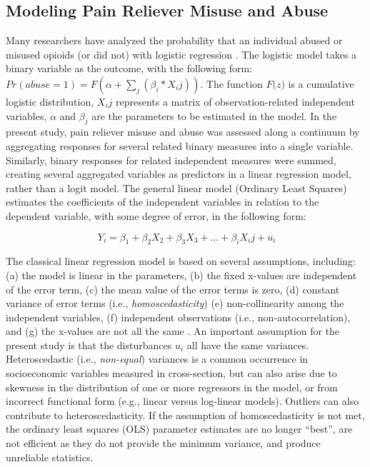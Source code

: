 \documentclass[sigconf]{acmart}
\begin{document}

\subsection{Modeling Pain Reliever Misuse and Abuse}

Many researchers have analyzed the probability that an individual abused 
or misused opioids (or did not) with logistic regression 
\cite{rice12, unick13, jones15, mccabe12, zedler14}. The logistic model takes
a binary variable as the outcome, with the following form: $ Pr(abuse=1) = 
\textit{F}(\alpha+\sum_j(\beta_i*X_ij)) $. The function $\textit{F(z)}$
is a cumulative logistic distribution, $\textit{X}_ij$ represents a matrix 
of observation-related independent variables, $\alpha$ and $\beta_j$ are the
parameters to be estimated in the model. In the present study, pain reliever 
misuse and abuse was assessed along a continuum by aggregating responses for 
several related binary measures into a single variable. Similarly, binary 
responses for related independent measures were summed, creating several 
aggregated variables as predictors in a linear regression model, rather than 
a logit model. The general linear model (Ordinary Least Squares) estimates 
the coefficients of the independent variables in relation to the dependent 
variable, with some degree of error, in the following form: 

\begin{equation}
  \ Y_i = \beta_1 + \beta_2X_2 +\beta_3X_3 +... + \beta_iX_ij + u_i
\end{equation}


The classical linear regression model is based on several assumptions, 
including: (a) the model is linear in the parameters, (b) the fixed x-values 
are independent of the error term, (c) the mean value of the error terms is 
zero, (d) constant variance of error terms (i.e., \emph{homoscedasticity}) 
(e) non-collinearity among the independent variables, (f) independent 
observations (i.e., non-autocorrelation), and (g) the x-values are not all 
the same . An important assumption for the present study is 
that the disturbances $u_i$ all have the same variances. Heteroscedastic 
(i.e., \emph{non-equal}) variances is a common occurrence in socioeconomic 
variables measured in cross-section, but can also arise due to skewness in 
the distribution of one or more regressors in the model, or from incorrect 
functional form (e.g., linear versus log-linear models). Outliers can also 
contribute to heteroscedasticity. If the assumption of homoscedasticity is 
not met, the ordinary least squares (OLS) parameter estimates are no longer 
``best'', are not efficient as they do not provide the minimum variance, 
and produce unreliable statistics. 
\end{document}
